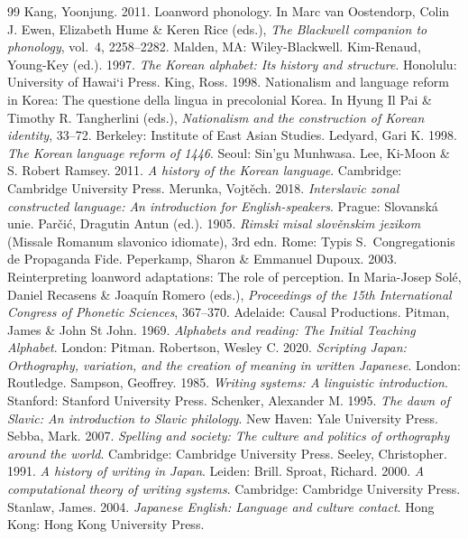 \documentclass[12pt]{article}
\begin{document}
\begin{thebibliography}{99}
 Kang, Yoonjung. 2011. Loanword phonology. In Marc van Oostendorp, Colin J. Ewen, Elizabeth Hume \& Keren Rice (eds.), \emph{The Blackwell companion to phonology}, vol.~4, 2258--2282. Malden, MA: Wiley-Blackwell.
 Kim-Renaud, Young-Key (ed.). 1997. \emph{The Korean alphabet: Its history and structure}. Honolulu: University of Hawai`i Press.
 King, Ross. 1998. Nationalism and language reform in Korea: The questione della lingua in precolonial Korea. In Hyung Il Pai \& Timothy R. Tangherlini (eds.), \emph{Nationalism and the construction of Korean identity}, 33--72. Berkeley: Institute of East Asian Studies.
 Ledyard, Gari K. 1998. \emph{The Korean language reform of 1446}. Seoul: Sin'gu Munhwasa.
 Lee, Ki-Moon \& S. Robert Ramsey. 2011. \emph{A history of the Korean language}. Cambridge: Cambridge University Press.
 Merunka, Vojt\v{e}ch. 2018. \emph{Interslavic zonal constructed language: An introduction for English-speakers}. Prague: Slovansk\'a unie.
 Par\v{c}i\'c, Dragutin Antun (ed.). 1905. \emph{Rimski misal slov\v{e}nskim jezikom} (Missale Romanum slavonico idiomate), 3rd edn. Rome: Typis S.~Congregationis de Propaganda Fide.
 Peperkamp, Sharon \& Emmanuel Dupoux. 2003. Reinterpreting loanword adaptations: The role of perception. In Maria-Josep Sol\'e, Daniel Recasens \& Joaqu\'in Romero (eds.), \emph{Proceedings of the 15th International Congress of Phonetic Sciences}, 367--370. Adelaide: Causal Productions.
 Pitman, James \& John St John. 1969. \emph{Alphabets and reading: The Initial Teaching Alphabet}. London: Pitman.
 Robertson, Wesley C. 2020. \emph{Scripting Japan: Orthography, variation, and the creation of meaning in written Japanese}. London: Routledge.
 Sampson, Geoffrey. 1985. \emph{Writing systems: A linguistic introduction}. Stanford: Stanford University Press.
 Schenker, Alexander M. 1995. \emph{The dawn of Slavic: An introduction to Slavic philology}. New Haven: Yale University Press.
 Sebba, Mark. 2007. \emph{Spelling and society: The culture and politics of orthography around the world}. Cambridge: Cambridge University Press.
 Seeley, Christopher. 1991. \emph{A history of writing in Japan}. Leiden: Brill.
 Sproat, Richard. 2000. \emph{A computational theory of writing systems}. Cambridge: Cambridge University Press.
 Stanlaw, James. 2004. \emph{Japanese English: Language and culture contact}. Hong Kong: Hong Kong University Press.

\end{thebibliography}
\end{document}
